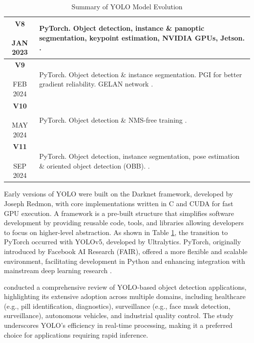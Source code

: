 \documentclass[a4paper,10pt,twocolumn]{article}
\numberwithin{figure}{section}
\numberwithin{table}{section}
\begin{document}
\begin{table}[htbp]
{\begin{tabularx}{\linewidth}{|c|X|}
        \hline
        \makecell[t]{\textbf{V8} \\ \\ {\tiny JAN 2023}} 
        & {\footnotesize PyTorch. Object detection, instance \& panoptic segmentation, keypoint estimation,
        NVIDIA GPUs, Jetson.
        \citep{ultralytics2025yolov8}.} \\
        \hline
        \makecell[t]{\textbf{V9} \\ \\ {\tiny FEB 2024}} 
        & {\footnotesize PyTorch. Object detection \& instance segmentation.
        PGI for better gradient reliability.
        GELAN network \citep{wang2024yolov9}.} \\
        \hline
        \makecell[t]{\textbf{V10} \\ \\ {\tiny MAY 2024}} 
        & {\footnotesize PyTorch. Object detection \& NMS-free training
        \citep{wang2024yolov10}.} \\
        \hline
        \makecell[t]{\textbf{V11} \\ \\ {\tiny SEP 2024}} 
        & {\footnotesize PyTorch. Object detection, instance segmentation, pose estimation \& oriented object detection (OBB).
        \citep{UltralyticsYOLO11}.} \\
        \hline
    \end{tabularx}
    }
    \caption{Summary of YOLO Model Evolution}
    \label{tab:yolo_versions}
\end{table}


Early versions of YOLO were built on the Darknet framework, 
developed by Joseph Redmon, with core implementations written in 
C and CUDA for fast GPU execution. A framework is a pre-built structure that simplifies software 
development by providing reusable code, tools, and libraries
allowing developers to focus on higher-level abstraction.
As shown in Table 
\ref{tab:yolo_versions}, the transition to PyTorch occurred 
with YOLOv5, developed by Ultralytics. 
PyTorch, originally introduced by Facebook AI Research (FAIR), 
offered a more flexible and scalable environment, 
facilitating development in Python and enhancing integration
 with mainstream deep learning research \citep{ultralytics2024yolov5}.

 \cite{Sapkota2025YOLOv11} conducted a comprehensive review of YOLO-based 
 object detection applications, highlighting its extensive adoption across 
 multiple domains, including healthcare (e.g., pill identification, diagnostics), 
 surveillance (e.g., face mask detection, surveillance), 
 autonomous vehicles, and industrial quality control. 
 The study underscores YOLO’s efficiency in real-time processing, 
 making it a preferred choice for applications requiring rapid inference.
\end{document}
